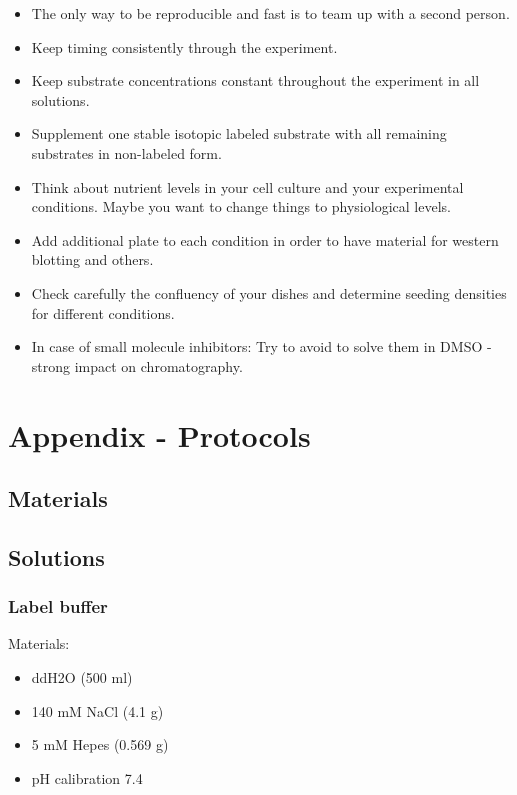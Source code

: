 \documentclass[]{book}
\providecommand{\tightlist}{%
  \setlength{\itemsep}{0pt}\setlength{\parskip}{0pt}}
\theoremstyle{definition}
\theoremstyle{definition}
\theoremstyle{definition}
\theoremstyle{remark}
\begin{document}
\begin{itemize}
\tightlist
\item
  The only way to be reproducible and fast is to team up with a second
  person.
\item
  Keep timing consistently through the experiment.
\item
  Keep substrate concentrations constant throughout the experiment in
  all solutions.
\item
  Supplement one stable isotopic labeled substrate with all remaining
  substrates in non-labeled form.
\item
  Think about nutrient levels in your cell culture and your experimental
  conditions. Maybe you want to change things to physiological levels.
\item
  Add additional plate to each condition in order to have material for
  western blotting and others.
\item
  Check carefully the confluency of your dishes and determine seeding
  densities for different conditions.
\item
  In case of small molecule inhibitors: Try to avoid to solve them in
  DMSO - strong impact on chromatography.
\end{itemize}

\chapter{Appendix - Protocols}\label{protocols}

\section{Materials}\label{materials}

\section{Solutions}\label{solutions}

\hypertarget{washingbuffer}{\subsection{Label
buffer}\label{washingbuffer}}

Materials:

\begin{itemize}
\tightlist
\item
  ddH2O (500 ml)
\item
  140 mM NaCl (4.1 g)
\item
  5 mM Hepes (0.569 g)
\item
  pH calibration 7.4
\end{itemize}
\end{document}
